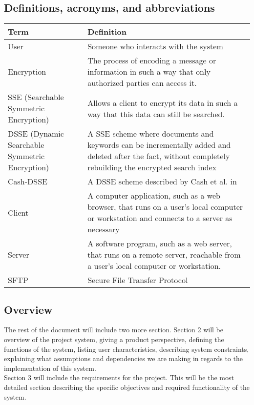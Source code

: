\documentclass[onecolumn, draftclsnofoot,10pt, compsoc]{IEEEtran}
\begin{document}
\subsection{ Definitions, acronyms, and abbreviations }
    \begin{tabular}{| p{3.5cm} | p{12.5cm} |}
    \hline
	\textbf{Term} & \textbf{Definition} \\ \hline
    User & Someone who interacts with the system \\ \hline 
    Encryption & The process of encoding a message or information in such a way that only authorized parties can access it. \\ \hline
    SSE (Searchable Symmetric Encryption) & Allows a client to encrypt its data in such a way that this data can still be searched.  \\ \hline 
    DSSE (Dynamic Searchable Symmetric Encryption) & A SSE scheme where documents and keywords can be incrementally added and deleted after the fact, without completely rebuilding the encrypted search index  \\ \hline
    Cash-DSSE & A DSSE scheme described by Cash et al. in \cite{cash14} \\ \hline
    Client & A computer application, such as a web browser, that runs on a user's local computer or workstation and connects to a server as 		necessary \\ \hline
    Server &  A software program, such as a web server, that runs on a remote server, reachable from a user's local computer or workstation. \\ \hline 
    SFTP & Secure File Transfer Protocol \\ \hline      
    \end{tabular}

    
    
\subsection{ Overview }
The rest of the document will include two more section. Section 2 will be overview of the project system, giving a product perspective, defining the functions of the system, listing user characteristics,  describing system constraints, explaining what assumptions and dependencies we are making in regards to the implementation of this system. \\
Section 3 will include the requirements for the project. This will be the most detailed section describing the specific objectives and required functionality of the system. 
\end{document}
